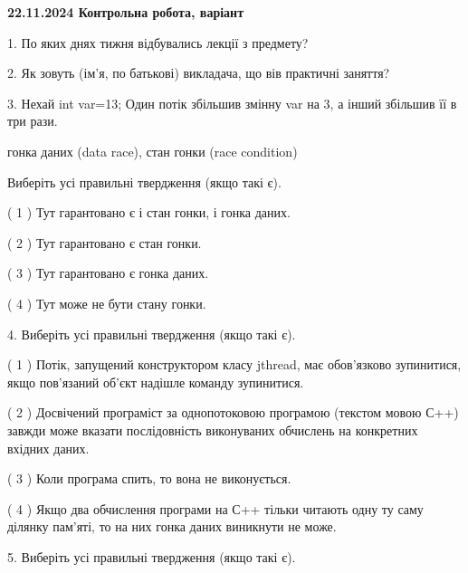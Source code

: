 \documentclass[12pt, ukrainian]{article}
\begin{document}
\vspace{4mm}
\newpage
\begin {large}

\textbf{22.11.2024 Контрольна робота, варіант  }\par


{
1. По яких днях тижня відбувались лекції з предмету?



\vspace{5mm}
2. Як зовуть (ім'я, по батькові) викладача, що вів практичні заняття?



\vspace{5mm}
3. Нехай int var=13; Один потік збільшив змінну var на 3, а інший збільшив її в три рази.

гонка даних (data race), стан гонки (race condition)

Виберіть усі правильні твердження (якщо такі є).\par
\vspace{2mm}
( 1 ) Тут гарантовано є і стан гонки, і гонка даних.%

( 2 ) Тут гарантовано є стан гонки.%

( 3 ) Тут гарантовано є гонка даних.%

( 4 ) Тут може не бути стану гонки.%


\vspace{5mm}
4. Виберіть усі правильні твердження (якщо такі є).\par
\vspace{2mm}

( 1 ) Потік, запущений конструктором класу jthread, має обов’язково зупинитися, якщо пов’язаний об’єкт надішле команду зупинитися.%

( 2 ) Досвічений програміст за однопотоковою програмою (текстом мовою С++) завжди може вказати послідовність виконуваних обчислень на конкретних вхідних даних.%

( 3 ) Коли програма спить, то вона не виконується.%

( 4 ) Якщо два обчислення програми на С++ тільки читають одну ту саму ділянку пам'яті, то на них гонка даних  виникнути не може.%


\vspace{5mm}
5. Виберіть усі правильні твердження (якщо такі є).\par
\vspace{2mm}

}
\end{large}
\end{document}
